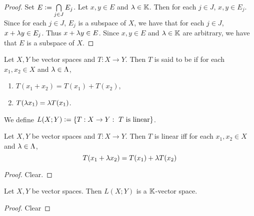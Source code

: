 \documentclass{book}
\begin{document}
\begin{proof}
	Set $E \vcentcolon= \bigcap\limits_{j \in J}E_j$. Let $x,y \in E$ and $\lambda \in \mathbb{K}$. Then for each $j \in J$, $x,y \in E_j$. Since for each $j \in J$, $E_j$ is a subspace of $X$, we have that for each $j \in J$, $x+ \lambda y \in E_j$. Thus $x+\lambda y \in E$. Since $x,y \in E$ and $\lambda \in \mathbb{K}$ are arbitrary,  we have that $E$ is a subspace of $X$. 
\end{proof}


























\begin{defn}
	Let $X, Y$ be vector spaces and $T:X \rightarrow Y$. Then $T$ is said to be  if for each $x_1, x_2 \in X$ and $\lambda \in \Lambda$, 
	\begin{enumerate}
		\item $T(x_1 + x_2) = T(x_1) + T(x_2)$,
		\item $T(\lambda x_1) = \lambda T(x_1)$.
	\end{enumerate}
	We define $L(X;Y) \vcentcolon= \{T:X \rightarrow Y: \text{ $T$ is linear}\}$. 
\end{defn}

\begin{ex}
	Let $X,Y$ be vector spaces and $T : X \rightarrow Y$. Then $T$ is linear iff for each $x_1, x_2 \in X$ and $\lambda \in \Lambda$, 
	$$T(x_1 + \lambda x_2) = T(x_1) + \lambda T(x_2)$$
\end{ex}

\begin{proof}
	Clear. 
\end{proof}

\begin{defn}
\end{defn}

\begin{ex}
	Let $X,Y$ be vector spaces. Then $L(X;Y)$ is a $\mathbb{K}$-vector space. 
\end{ex}

\begin{proof}
	Clear
\end{proof}
\end{document}

